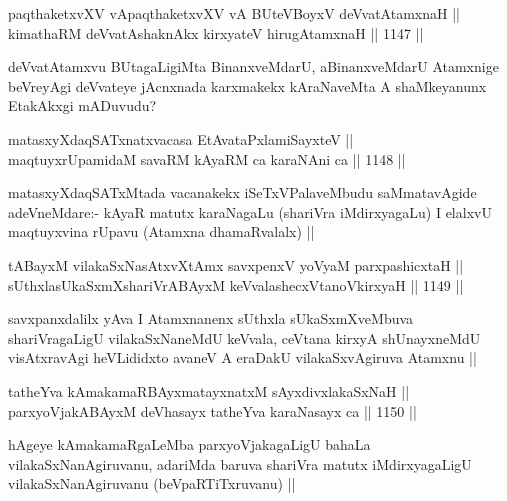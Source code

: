 \begin{shl}
paqthaketxvXV vA\s paqthaketxvXV vA BUteVBoyxV deVvatAtamxnaH ||  \\
kimathaRM deVvatAshaknAkx kirxyateV hirugAtamxnaH ||  1147 ||  
\end{shl}

\begin{artha}
deVvatAtamxvu BUtagaLigiMta BinanxveMdarU, aBinanxveMdarU Atamxnige beVreyAgi deVvateye jAcnxnada karxmakekx kAraNaveMta A shaMkeyanunx EtakAkxgi mADuvudu?
\end{artha}


\begin{shl}
matasxyXdaqSATxnatxvacasa EtAvataPxlamiSayxteV || \\
maqtuyxrUpamidaM savaRM kAyaRM ca karaNAni ca ||  1148 ||  
\end{shl}

\begin{artha}
matasxyXdaqSATxMtada vacanakekx iSeTxVPalaveMbudu saMmatavAgide adeVneMdare:- kAyaR matutx karaNagaLu (shariVra iMdirxyagaLu) I elalxvU maqtuyxvina rUpavu (Atamxna dhamaRvalalx) ||
\end{artha}

\begin{shl}
tABayxM vilakaSxNasAtxvXtAmx savxpenxV yoV\s yaM parxpashicxtaH || \\
sUthxlasUkaSxmXshariVrABAyxM keVvalashecxVtanoV\s kirxyaH ||  1149 ||  
\end{shl}

\begin{artha}
savxpanxdalilx yAva I Atamxnanenx sUthxla sUkaSxmXveMbuva shariVragaLigU vilakaSxNaneMdU keVvala, ceVtana kirxyA shUnayxneMdU visAtxravAgi heVLididxto avaneV A eraDakU vilakaSxvAgiruva Atamxnu || 
\end{artha}


\begin{shl}
tatheYva kAmakamaRBAyxmatayxnatxM sAyxdivxlakaSxNaH || \\
parxyoVjakABAyxM deVhasayx tatheYva karaNasayx ca ||  1150 ||  
\end{shl}

\begin{artha}
hAgeye kAmakamaRgaLeMba parxyoVjakagaLigU bahaLa vilakaSxNanAgiruvanu, adariMda baruva shariVra matutx iMdirxyagaLigU vilakaSxNanAgiruvanu (beVpaRTiTxruvanu) ||
\end{artha}


